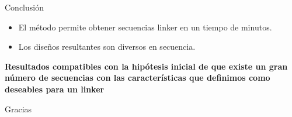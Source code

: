 \documentclass{beamer}
\begin{document}
\begin{frame}{Conclusión}
\begin{itemize}
  \item El método permite obtener secuencias linker en un tiempo de minutos.
  \item Los diseños resultantes son diversos en secuencia.
\end{itemize}
% 
\vspace{20px}

\textbf{Resultados compatibles con la hipótesis inicial de que existe un gran número de secuencias con las características que definimos como deseables para un linker}
\end{frame}



\begin{frame}
\begin{center}
 \huge Gracias
\end{center}
\end{frame}


























\end{document}
